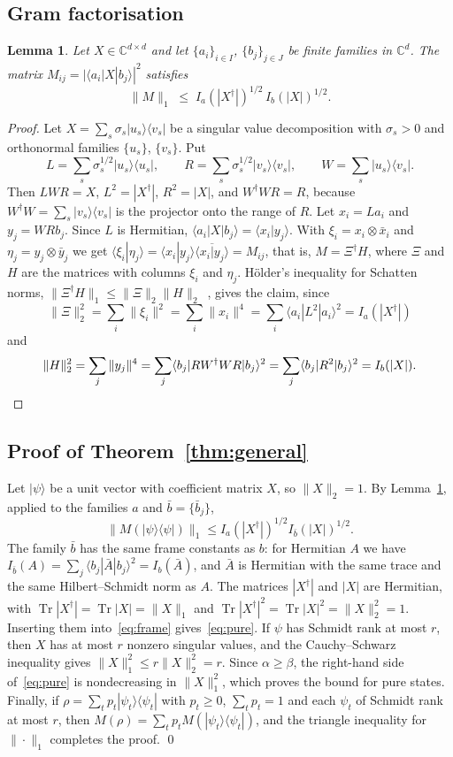 \documentclass[11pt]{amsart}
\newtheorem{lemma}[theorem]{Lemma}
\theoremstyle{definition}
\theoremstyle{remark}
\newcommand{\C}{\mathbb{C}}
\newcommand{\Tr}{\operatorname{Tr}}
\newcommand{\ket}[1]{|#1\rangle}
\newcommand{\bra}[1]{\langle #1|}
\begin{document}
\subsection{Gram factorisation}

\begin{lemma}\label{lem:factor}
Let $X\in\C^{d\times d}$ and let $\{a_i\}_{i\in I}$, $\{b_j\}_{j\in J}$ be finite families in $\C^d$. The matrix
$M_{ij}=|\bra{a_i}X\ket{b_j}|^2$ satisfies
\[
\|M\|_1\;\le\;I_a(|X^\dagger|)^{1/2}\,I_b(|X|)^{1/2}.
\]
\end{lemma}

\begin{proof}
Let $X=\sum_s\sigma_s\ket{u_s}\bra{v_s}$ be a singular value decomposition with $\sigma_s>0$ and orthonormal
families $\{u_s\}$, $\{v_s\}$. Put
\[
L=\sum_s\sigma_s^{1/2}\ket{u_s}\bra{u_s},\qquad R=\sum_s\sigma_s^{1/2}\ket{v_s}\bra{v_s},\qquad
W=\sum_s\ket{u_s}\bra{v_s}.
\]
Then $LWR=X$, $L^2=|X^\dagger|$, $R^2=|X|$, and $W^\dagger W R=R$, because $W^\dagger W=\sum_s\ket{v_s}\bra{v_s}$
is the projector onto the range of $R$. Let $x_i=La_i$ and $y_j=WRb_j$. Since $L$ is Hermitian,
$\bra{a_i}X\ket{b_j}=\langle x_i|y_j\rangle$. With $\xi_i=x_i\otimes\bar x_i$ and $\eta_j=y_j\otimes\bar y_j$ we get
$\langle\xi_i|\eta_j\rangle=\langle x_i|y_j\rangle\overline{\langle x_i|y_j\rangle}=M_{ij}$, that is,
$M=\Xi^\dagger H$, where $\Xi$ and $H$ are the matrices with columns $\xi_i$ and $\eta_j$. H\"older's inequality for
Schatten norms, $\|\Xi^\dagger H\|_1\le\|\Xi\|_2\|H\|_2$~\cite{Bhatia1997}, gives the claim, since
\[
\|\Xi\|_2^2=\sum_i\|\xi_i\|^2=\sum_i\|x_i\|^4=\sum_i\bra{a_i}L^2\ket{a_i}^2=I_a(|X^\dagger|)
\]
and
\[
\|H\|_2^2=\sum_j\|y_j\|^4=\sum_j\bra{b_j}RW^\dagger WR\ket{b_j}^2=\sum_j\bra{b_j}R^2\ket{b_j}^2=I_b(|X|). \qedhere
\]
\end{proof}

\subsection{Proof of Theorem~\ref{thm:general}}
Let $\ket\psi$ be a unit vector with coefficient matrix $X$, so $\|X\|_2=1$. By Lemma~\ref{lem:factor}, applied to
the families $a$ and $\bar b=\{\bar b_j\}$,
\[
\|M(\ket\psi\bra\psi)\|_1\le I_a(|X^\dagger|)^{1/2}I_{\bar b}(|X|)^{1/2}.
\]
The family $\bar b$ has the same frame constants as $b$: for Hermitian $A$ we have
$I_{\bar b}(A)=\sum_j\bra{b_j}\bar A\ket{b_j}^2=I_b(\bar A)$, and $\bar A$ is Hermitian with the same trace and the
same Hilbert--Schmidt norm as $A$. The matrices $|X^\dagger|$ and $|X|$ are Hermitian, with
$\Tr|X^\dagger|=\Tr|X|=\|X\|_1$ and $\Tr|X^\dagger|^2=\Tr|X|^2=\|X\|_2^2=1$. Inserting them into~\eqref{eq:frame}
gives~\eqref{eq:pure}. If $\psi$ has Schmidt rank at most $r$, then $X$ has at most $r$ nonzero singular values,
and the Cauchy--Schwarz inequality gives $\|X\|_1^2\le r\|X\|_2^2=r$. Since $\alpha\ge\beta$, the right-hand side
of~\eqref{eq:pure} is nondecreasing in $\|X\|_1^2$, which proves the bound for pure states. Finally, if
$\rho=\sum_tp_t\ket{\psi_t}\bra{\psi_t}$ with $p_t\ge0$, $\sum_tp_t=1$ and each $\psi_t$ of Schmidt rank at most
$r$, then $M(\rho)=\sum_tp_tM(\ket{\psi_t}\bra{\psi_t})$, and the triangle inequality for $\|\cdot\|_1$ completes
the proof. \qed
\end{document}
